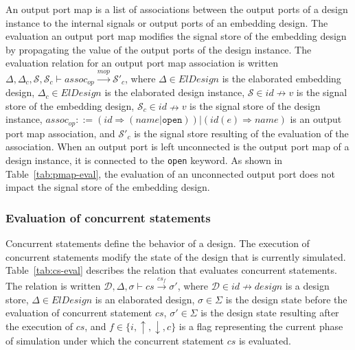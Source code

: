 An output port map is a list of associations between the output ports
of a design instance to the internal signals or output ports of an
embedding design.  The evaluation an output port map modifies the
signal store of the embedding design by propagating the value of the
output ports of the design instance. The evaluation relation for an
output port map association is written
$\Delta,\Delta_c,\mathcal{S},\mathcal{S}_c\vdash{}assoc_{op}\xrightarrow{mop}\mathcal{S}'_c$,
where $\Delta\in{}ElDesign$ is the elaborated embedding design,
$\Delta_c\in{}ElDesign$ is the elaborated design instance,
$\mathcal{S}\in{}id\nrightarrow{}v$ is the signal store of the
embedding design, $\mathcal{S}_c\in{}id\nrightarrow{}v$ is the signal
store of the design instance,
$assoc_{op}::=(id\Rightarrow{}(name|\mathtt{open}))\big|(id(e)\Rightarrow{}name)$
is an output port map association, and $\mathcal{S}'_c$ is the signal
store resulting of the evaluation of the association. When an output
port is left unconnected is the output port map of a design instance,
it is connected to the \texttt{open} keyword. As shown in
Table~\ref{tab:pmap-eval}, the evaluation of an unconnected output
port does not impact the signal store of the embedding design. 

\subsubsection{Evaluation of concurrent statements}
\label{subsubsec:cs-eval}

Concurrent statements define the behavior of a \hvhdl{} design. The
execution of concurrent statements modify the state of the \hvhdl{}
design that is currently simulated. Table~\ref{tab:cs-eval} describes
the relation that evaluates concurrent statements. The relation is
written
$\mathcal{D},\Delta,\sigma\vdash{}cs\xrightarrow{cs_f}\sigma'$, where
$\mathcal{D}\in{}id\nrightarrow{}design$ is a design store,
$\Delta\in{}ElDesign$ is an elaborated design, $\sigma\in\Sigma$ is
the design state before the evaluation of concurrent statement $cs$,
$\sigma'\in\Sigma$ is the design state resulting after the execution
of $cs$, and $f\in\{i,\uparrow,\downarrow,c\}$ is a flag representing
the current phase of simulation under which the concurrent statement
$cs$ is evaluated.

